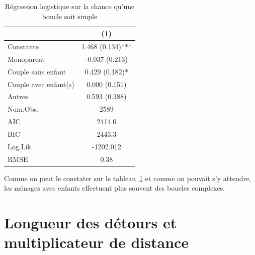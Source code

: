 \documentclass[
  9pt,
  a4paper,
  DIV=11]{scrreprt}
\begin{document}
\begin{longtable}{lc}

\caption{\label{tbl-logit-simple}Régression logistique sur la chance
qu'une boucle soit simple}

\tabularnewline

\toprule
  & (1) \\ 
\midrule\addlinespace[2.5pt]
Constante & 1.468 (0.134)*** \\ 
Monoparent & -0.037 (0.213) \\ 
Couple sans enfant & 0.429 (0.182)* \\ 
Couple avec enfant(s) & 0.000 (0.151) \\ 
Autres & 0.593 (0.388) \\ 
Num.Obs. & 2589 \\ 
AIC & 2414.0 \\ 
BIC & 2443.3 \\ 
Log.Lik. & -1202.012 \\ 
RMSE & 0.38 \\ 
\bottomrule

\end{longtable}

Comme on peut le constater sur le tableau~\ref{tbl-logit-simple} et
comme on pouvait s'y attendre, les ménages avec enfants effectuent plus
souvent des boucles complexes.

\section{Longueur des détours et multiplicateur de
distance}\label{longueur-des-duxe9tours-et-multiplicateur-de-distance}
\end{document}

